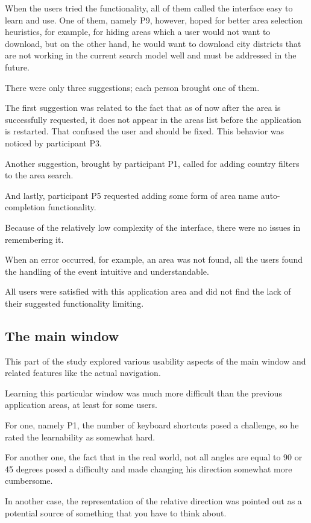 \documentclass[nolof,digital]{fithesis3}
\begin{document}
When the users tried the functionality, all of them called the interface easy to learn and use. One of them, namely P9, however, hoped for better area selection heuristics, for example, for hiding areas which a user would not want to download, but on the other hand, he would want to download city districts that are not working in the current search model well and must be addressed in the future.

There were only three suggestions; each person brought one of them.

The first suggestion was related to the fact that as of now after the area is successfully requested, it does not appear in the areas list before the application is restarted. That confused the user and should be fixed. This behavior was noticed by participant P3.

Another suggestion, brought by participant P1, called for adding country filters to the area search. 

And lastly, participant P5 requested adding some form of area name auto-completion functionality.

Because of the relatively low complexity of the interface, there were no issues in remembering it.

When an error occurred, for example, an area was not found, all the users found the handling of the event intuitive and understandable.

All users were satisfied with this application area and did not find the lack of their suggested functionality limiting.
\subsection{The main window}
This part of the study explored various usability aspects of the main window and related features like the actual navigation.

Learning this particular window was much more difficult than the previous application areas, at least for some users.

For one, namely P1, the number of keyboard shortcuts posed a challenge, so he rated the learnability as somewhat hard.

For another one, the fact that in the real world, not all angles are equal to 90 or 45 degrees posed a difficulty and made changing his direction somewhat more cumbersome.

In another case, the representation of the relative direction was pointed out as a potential source of something that you have to think about.
\end{document}
